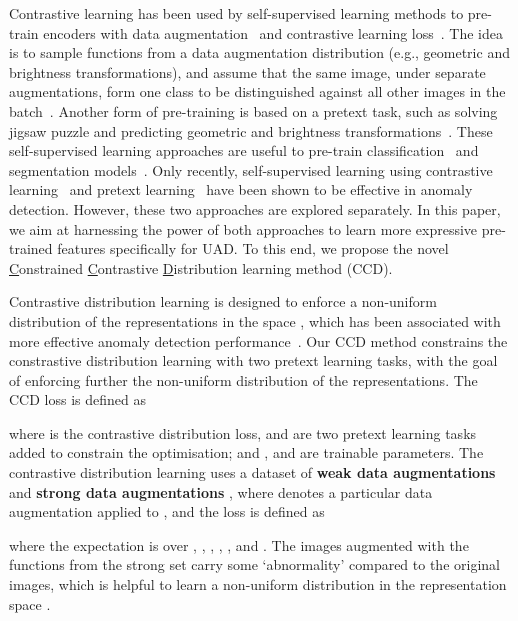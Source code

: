 \documentclass[runningheads]{llncs}
\begin{document}
Contrastive learning has been used by self-supervised learning methods to pre-train encoders with data augmentation~\cite{simclr,moco,wang2020understanding} and contrastive learning loss~\cite{sohn2016improved}.  The idea is to sample functions from a data augmentation distribution (e.g., geometric and brightness transformations), and assume that the same image, under separate augmentations, form one class to be distinguished against all other images in the batch~\cite{bergman2020classification,golan2018deep}.  
Another form of pre-training is based on a pretext task, such as solving jigsaw puzzle and predicting geometric and brightness transformations~\cite{simclr,moco}. 
These self-supervised learning approaches are useful to pre-train classification~\cite{simclr,moco} and segmentation models~\cite{yi2020patch,noroozi2016unsupervised}.
Only recently, self-supervised learning 
using contrastive learning~\cite{sohn2020learning} and pretext learning~\cite{golan2018deep,bergman2020classification} have been shown to be effective in anomaly detection. 
However, these two approaches are explored separately. In this paper, we aim at harnessing the power of both approaches to learn more expressive pre-trained features specifically for UAD. 
To this end, we propose the novel \underline{C}onstrained \underline{C}ontrastive \underline{D}istribution learning method (CCD).

Contrastive distribution learning is designed to enforce a non-uniform distribution of the representations in the space , 
which has been associated with more effective anomaly detection performance~\cite{sohn2020learning}.
Our CCD method constrains the constrastive distribution learning with two pretext learning tasks, with the goal of enforcing further the non-uniform distribution of the representations.
The CCD loss is defined as

where  is the contrastive distribution loss,  and  are two pretext learning tasks added to constrain the optimisation; and ,  and  are trainable parameters. The contrastive distribution learning 
uses a dataset of \textbf{weak data augmentations}  and \textbf{strong data augmentations} , where 
 denotes a particular data augmentation applied to , and the loss is defined as

where the expectation is over , 
, , ,
, and . The images augmented with the functions from the strong set  carry some `abnormality' compared to the original images, which is helpful to learn a non-uniform distribution in the representation space . 
\end{document}
